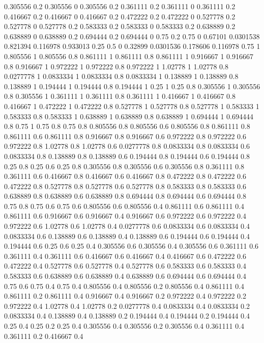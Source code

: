 0.305556 0.2
0.305556 0
0.305556 0.2
0.361111 0.2
0.361111 0
0.361111 0.2
0.416667 0.2
0.416667 0
0.416667 0.2
0.472222 0.2
0.472222 0
0.527778 0.2
0.527778 0
0.527778 0.2
0.583333 0.2
0.583333 0
0.583333 0.2
0.638889 0.2
0.638889 0
0.638889 0.2
0.694444 0.2
0.694444 0
0.75 0.2
0.75 0
0.67101 0.0301538
0.821394 0.116978
0.933013 0.25
0.5 0
0.32899 0.0301536
0.178606 0.116978
0.75 1
0.805556 1
0.805556 0.8
0.861111 1
0.861111 0.8
0.861111 1
0.916667 1
0.916667 0.8
0.916667 1
0.972222 1
0.972222 0.8
0.972222 1
1.02778 1
1.02778 0.8
0.0277778 1
0.0833334 1
0.0833334 0.8
0.0833334 1
0.138889 1
0.138889 0.8
0.138889 1
0.194444 1
0.194444 0.8
0.194444 1
0.25 1
0.25 0.8
0.305556 1
0.305556 0.8
0.305556 1
0.361111 1
0.361111 0.8
0.361111 1
0.416667 1
0.416667 0.8
0.416667 1
0.472222 1
0.472222 0.8
0.527778 1
0.527778 0.8
0.527778 1
0.583333 1
0.583333 0.8
0.583333 1
0.638889 1
0.638889 0.8
0.638889 1
0.694444 1
0.694444 0.8
0.75 1
0.75 0.8
0.75 0.8
0.805556 0.8
0.805556 0.6
0.805556 0.8
0.861111 0.8
0.861111 0.6
0.861111 0.8
0.916667 0.8
0.916667 0.6
0.972222 0.8
0.972222 0.6
0.972222 0.8
1.02778 0.8
1.02778 0.6
0.0277778 0.8
0.0833334 0.8
0.0833334 0.6
0.0833334 0.8
0.138889 0.8
0.138889 0.6
0.194444 0.8
0.194444 0.6
0.194444 0.8
0.25 0.8
0.25 0.6
0.25 0.8
0.305556 0.8
0.305556 0.6
0.305556 0.8
0.361111 0.8
0.361111 0.6
0.416667 0.8
0.416667 0.6
0.416667 0.8
0.472222 0.8
0.472222 0.6
0.472222 0.8
0.527778 0.8
0.527778 0.6
0.527778 0.8
0.583333 0.8
0.583333 0.6
0.638889 0.8
0.638889 0.6
0.638889 0.8
0.694444 0.8
0.694444 0.6
0.694444 0.8
0.75 0.8
0.75 0.6
0.75 0.6
0.805556 0.6
0.805556 0.4
0.861111 0.6
0.861111 0.4
0.861111 0.6
0.916667 0.6
0.916667 0.4
0.916667 0.6
0.972222 0.6
0.972222 0.4
0.972222 0.6
1.02778 0.6
1.02778 0.4
0.0277778 0.6
0.0833334 0.6
0.0833334 0.4
0.0833334 0.6
0.138889 0.6
0.138889 0.4
0.138889 0.6
0.194444 0.6
0.194444 0.4
0.194444 0.6
0.25 0.6
0.25 0.4
0.305556 0.6
0.305556 0.4
0.305556 0.6
0.361111 0.6
0.361111 0.4
0.361111 0.6
0.416667 0.6
0.416667 0.4
0.416667 0.6
0.472222 0.6
0.472222 0.4
0.527778 0.6
0.527778 0.4
0.527778 0.6
0.583333 0.6
0.583333 0.4
0.583333 0.6
0.638889 0.6
0.638889 0.4
0.638889 0.6
0.694444 0.6
0.694444 0.4
0.75 0.6
0.75 0.4
0.75 0.4
0.805556 0.4
0.805556 0.2
0.805556 0.4
0.861111 0.4
0.861111 0.2
0.861111 0.4
0.916667 0.4
0.916667 0.2
0.972222 0.4
0.972222 0.2
0.972222 0.4
1.02778 0.4
1.02778 0.2
0.0277778 0.4
0.0833334 0.4
0.0833334 0.2
0.0833334 0.4
0.138889 0.4
0.138889 0.2
0.194444 0.4
0.194444 0.2
0.194444 0.4
0.25 0.4
0.25 0.2
0.25 0.4
0.305556 0.4
0.305556 0.2
0.305556 0.4
0.361111 0.4
0.361111 0.2
0.416667 0.4
